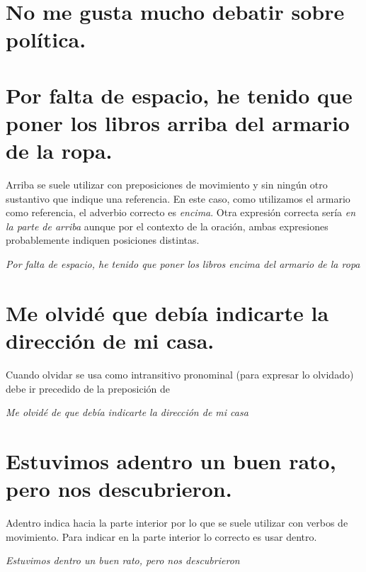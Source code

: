 \documentclass[12pt, a4paper, oneside]{report}
\begin{document}
        \section{No me gusta mucho debatir sobre política.}

        \section{Por falta de espacio, he tenido que poner los libros \color{rojo}arriba\color{negro} \;del
        armario de la ropa.}
        Arriba se suele utilizar con preposiciones de movimiento y sin ningún otro sustantivo que indique una
        referencia. En este caso, como utilizamos el armario como referencia, el adverbio correcto es
        \emph{encima}. Otra expresión correcta sería \emph{en la parte de arriba} aunque por el contexto de la
        oración, ambas expresiones probablemente indiquen posiciones distintas.
        \begin{center}
            \textit{Por falta de espacio, he tenido que poner los libros \color{verde}encima\color{negro}
            \;del armario de la ropa}
        \end{center}
        \clearpage

        \setcounter{chapter}{4}
        \setcounter{section}{0}

        \section{Me olvidé \color{rojo}que\color{negro} \;debía indicarte la dirección de mi casa.}
        Cuando olvidar se usa como intransitivo pronominal (para expresar lo olvidado) debe ir
precedido de la preposición de
        \begin{center}
            \textit{Me olvidé \color{verde}de que\color{negro} \;debía indicarte la dirección de mi casa}
        \end{center}

        \section{Estuvimos \color{rojo}adentro\color{negro} \;un buen rato, pero nos descubrieron.}
        Adentro indica hacia la parte interior por lo que se suele utilizar con verbos de movimiento.
Para indicar en la parte interior lo correcto es usar dentro.
        \begin{center}
            \textit{Estuvimos \color{verde}dentro\color{negro} \;un buen rato, pero nos descubrieron}
        \end{center}
\end{document}
